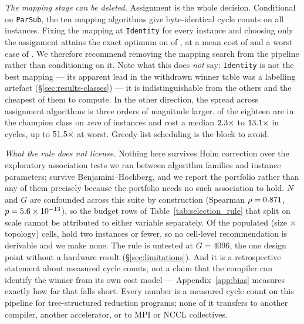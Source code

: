 \documentclass[journal,10pt]{IEEEtran}
\theoremstyle{plain}
\theoremstyle{definition}
\theoremstyle{remark}
\newcommand{\sv}[1]{\texttt{#1}}
\begin{document}
\emph{The mapping stage can be deleted.} Assignment is the whole decision.
Conditional on \sv{ParSub}, the ten mapping algorithms give byte-identical
cycle counts on all \TournNInst{} instances. Fixing the mapping at
\sv{Identity} for every instance and choosing only the assignment attains the
exact optimum on \SelIdentityOpt{} of \TournNInst{}, at a mean cost of
\SelIdentityMean{} and a worst case of \SelIdentityWorst{}. We therefore
recommend removing the mapping search from the pipeline rather than
conditioning on it. Note what this does \emph{not} say: \sv{Identity} is not
the best mapping --- its apparent lead in the withdrawn winner table was a
labelling artefact (\S\ref{sec:results-classes}) --- it is indistinguishable
from the others and the cheapest of them to compute. In the other direction,
the spread across assignment algorithms is three orders of magnitude larger.
\SelZeroCount{} of the eighteen are in the champion class on \emph{zero} of
\TournNInst{} instances and cost a median $2.3\times$ to
$13.1\times$ in cycles, up to $51.5\times$ at worst.
Greedy list scheduling is the block to avoid.



\emph{What the rule does not license.} Nothing here survives Holm correction
over the \SelExpTests{} exploratory association tests we ran between
algorithm families and instance parameters; \SelBHSurvivors{} survive
Benjamini--Hochberg, and we report the portfolio rather than any of them
precisely because the portfolio needs no such association to hold. $N$ and
$G$ are confounded across this suite by construction (Spearman $\rho =
0.871$, $p = 5.6\times10^{-13}$), so the budget rows of
Table~\ref{tab:selection_rule} that split on scale cannot be attributed to
either variable separately. Of the \SelPopCells{} populated (size $\times$ topology)
cells, \SelThinCells{} hold two instances or fewer, so no cell-level
recommendation is derivable and we make none. The rule is untested at
$G = 4096$, the one design point without a hardware result
(\S\ref{sec:limitations}). And it is a retrospective statement about measured
cycle counts, not a claim that the compiler can identify the winner from its
own cost model --- Appendix~\ref{app:bias} measures exactly how far that
falls short. Every number is a measured cycle count on this pipeline for
tree-structured reduction programs; none of it transfers to another compiler,
another accelerator, or to MPI or NCCL collectives.

\end{document}

